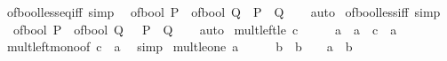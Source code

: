 \begin{isabellebody}
{\isafoldproof}%
%
\isadelimproof
\isanewline
%
\endisadelimproof
\isanewline
{}\isamarkupfalse%
\ of{\isacharunderscore}{\kern0pt}bool{\isacharunderscore}{\kern0pt}less{\isacharunderscore}{\kern0pt}eq{\isacharunderscore}{\kern0pt}iff\ {\isacharbrackleft}{\kern0pt}simp{\isacharbrackright}{\kern0pt}{\isacharcolon}{\kern0pt}\isanewline
\ \ {\isacartoucheopen}of{\isacharunderscore}{\kern0pt}bool\ P\ {\isasymle}\ of{\isacharunderscore}{\kern0pt}bool\ Q\ {\isasymlongleftrightarrow}\ {\isacharparenleft}{\kern0pt}P\ {\isasymlongrightarrow}\ Q{\isacharparenright}{\kern0pt}{\isacartoucheclose}\isanewline
%
\isadelimproof
\ \ %
\endisadelimproof
%
\isatagproof
{}\isamarkupfalse%
\ auto%
\endisatagproof
{\isafoldproof}%
%
\isadelimproof
\isanewline
%
\endisadelimproof
\isanewline
{}\isamarkupfalse%
\ of{\isacharunderscore}{\kern0pt}bool{\isacharunderscore}{\kern0pt}less{\isacharunderscore}{\kern0pt}iff\ {\isacharbrackleft}{\kern0pt}simp{\isacharbrackright}{\kern0pt}{\isacharcolon}{\kern0pt}\isanewline
\ \ {\isacartoucheopen}of{\isacharunderscore}{\kern0pt}bool\ P\ {\isacharless}{\kern0pt}\ of{\isacharunderscore}{\kern0pt}bool\ Q\ {\isasymlongleftrightarrow}\ {\isasymnot}\ P\ {\isasymand}\ Q{\isacartoucheclose}\isanewline
%
\isadelimproof
\ \ %
\endisadelimproof
%
\isatagproof
{}\isamarkupfalse%
\ auto%
\endisatagproof
{\isafoldproof}%
%
\isadelimproof
\isanewline
%
\endisadelimproof
\isanewline
{}\isamarkupfalse%
\ mult{\isacharunderscore}{\kern0pt}left{\isacharunderscore}{\kern0pt}le{\isacharcolon}{\kern0pt}\ {\isachardoublequoteopen}c\ {\isasymle}\ {}\ {\isasymLongrightarrow}\ {}\ {\isasymle}\ a\ {\isasymLongrightarrow}\ a\ {\isacharasterisk}{\kern0pt}\ c\ {\isasymle}\ a{\isachardoublequoteclose}\isanewline
%
\isadelimproof
\ \ %
\endisadelimproof
%
\isatagproof
{}\isamarkupfalse%
\ mult{\isacharunderscore}{\kern0pt}left{\isacharunderscore}{\kern0pt}mono{\isacharbrackleft}{\kern0pt}of\ c\ {}\ a{\isacharbrackright}{\kern0pt}\ \isamarkupfalse%
\ simp%
\endisatagproof
{\isafoldproof}%
%
\isadelimproof
\isanewline
%
\endisadelimproof
\isanewline
{}\isamarkupfalse%
\ mult{\isacharunderscore}{\kern0pt}le{\isacharunderscore}{\kern0pt}one{\isacharcolon}{\kern0pt}\ {\isachardoublequoteopen}a\ {\isasymle}\ {}\ {\isasymLongrightarrow}\ {}\ {\isasymle}\ b\ {\isasymLongrightarrow}\ b\ {\isasymle}\ {}\ {\isasymLongrightarrow}\ a\ {\isacharasterisk}{\kern0pt}\ b\ {\isasymle}\ {}{\isachardoublequoteclose}\isanewline

\end{isabellebody}
